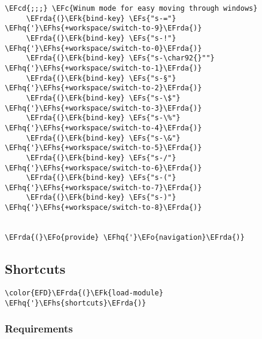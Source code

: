 \documentclass[a4wide,10pt]{article}
\newcommand{\EFc}[1]{\textcolor{EFc}{#1}} %
\newcommand{\EFcd}[1]{\textcolor{EFcd}{#1}} %
\newcommand{\EFs}[1]{\textcolor{EFs}{#1}} %
\newcommand{\EFk}[1]{\textcolor{EFk}{#1}} %
\newcommand{\EFo}[1]{\textcolor{EFo}{#1}} %
\newcommand{\EFhq}[1]{\textcolor{EFhq}{#1}} %
\newcommand{\EFhs}[1]{\textcolor{EFhs}{#1}} %
\newcommand{\EFrda}[1]{\textcolor{EFrda}{#1}} %
\begin{document}
\begin{Code}
\begin{Verbatim}
\EFcd{;;;} \EFc{Winum mode for easy moving through windows}
	 \EFrda{(}\EFk{bind-key} \EFs{"s-="} \EFhq{'}\EFhs{+workspace/switch-to-9}\EFrda{)}
	 \EFrda{(}\EFk{bind-key} \EFs{"s-!"} \EFhq{'}\EFhs{+workspace/switch-to-0}\EFrda{)}
	 \EFrda{(}\EFk{bind-key} \EFs{"s-\char92{}""} \EFhq{'}\EFhs{+workspace/switch-to-1}\EFrda{)}
	 \EFrda{(}\EFk{bind-key} \EFs{"s-§"} \EFhq{'}\EFhs{+workspace/switch-to-2}\EFrda{)}
	 \EFrda{(}\EFk{bind-key} \EFs{"s-\$"} \EFhq{'}\EFhs{+workspace/switch-to-3}\EFrda{)}
	 \EFrda{(}\EFk{bind-key} \EFs{"s-\%"} \EFhq{'}\EFhs{+workspace/switch-to-4}\EFrda{)}
	 \EFrda{(}\EFk{bind-key} \EFs{"s-\&"} \EFhq{'}\EFhs{+workspace/switch-to-5}\EFrda{)}
	 \EFrda{(}\EFk{bind-key} \EFs{"s-/"} \EFhq{'}\EFhs{+workspace/switch-to-6}\EFrda{)}
	 \EFrda{(}\EFk{bind-key} \EFs{"s-("} \EFhq{'}\EFhs{+workspace/switch-to-7}\EFrda{)}
	 \EFrda{(}\EFk{bind-key} \EFs{"s-)"} \EFhq{'}\EFhs{+workspace/switch-to-8}\EFrda{)}


\EFrda{(}\EFo{provide} \EFhq{'}\EFo{navigation}\EFrda{)}
\end{Verbatim}
\end{Code}
\subsection{Shortcuts}
\label{sec:org9f1cd56}
\begin{Code}
\begin{Verbatim}
\color{EFD}\EFrda{(}\EFk{load-module} \EFhq{'}\EFhs{shortcuts}\EFrda{)}
\end{Verbatim}
\end{Code}
\subsubsection{Requirements}
\label{sec:org35cd201}
\end{document}
